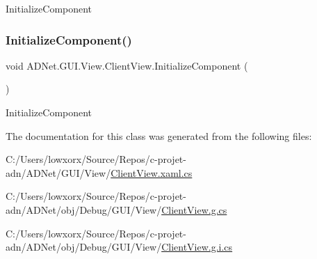 Initialize\+Component 

\mbox{\label{class_a_d_net_1_1_g_u_i_1_1_view_1_1_client_view_a7900e15bd1aa06af5875d5257e6b17ac}} 
\subsubsection{\texorpdfstring{Initialize\+Component()}{InitializeComponent()}\hspace{0.1cm}{\footnotesize\ttfamily [2/2]}}
{\footnotesize\ttfamily void A\+D\+Net.\+G\+U\+I.\+View.\+Client\+View.\+Initialize\+Component (\begin{DoxyParamCaption}{ }\end{DoxyParamCaption})}



Initialize\+Component 



The documentation for this class was generated from the following files\+:\begin{DoxyCompactItemize}
\item 
C\+:/\+Users/lowxorx/\+Source/\+Repos/c-\/projet-\/adn/\+A\+D\+Net/\+G\+U\+I/\+View/\hyperlink{_client_view_8xaml_8cs}{Client\+View.\+xaml.\+cs}\item 
C\+:/\+Users/lowxorx/\+Source/\+Repos/c-\/projet-\/adn/\+A\+D\+Net/obj/\+Debug/\+G\+U\+I/\+View/\hyperlink{_client_view_8g_8cs}{Client\+View.\+g.\+cs}\item 
C\+:/\+Users/lowxorx/\+Source/\+Repos/c-\/projet-\/adn/\+A\+D\+Net/obj/\+Debug/\+G\+U\+I/\+View/\hyperlink{_client_view_8g_8i_8cs}{Client\+View.\+g.\+i.\+cs}\end{DoxyCompactItemize}
